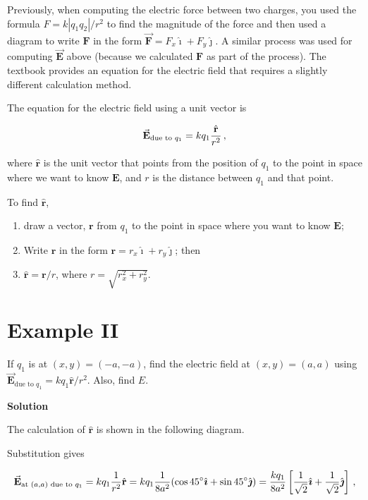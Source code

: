 \documentclass{article}
\newcommand{\ihat}[0]{\hat{\boldsymbol{\imath}}}
\newcommand{\jhat}[0]{\hat{\boldsymbol{\jmath}}}
\newcommand{\rhat}[0]{\hat{\mathbf{r}}}
\newcommand{\bfvec}[1]{\vec{\mathbf{#1}}}
\begin{document}
Previously, when computing the electric force between two charges, you used the formula $F=k{|q_1q_2|}/{r^2}$ to find the magnitude of the force and then used a diagram to write $\mathbf{F}$ in the form $\bfvec{F}=F_x\ihat + F_y\jhat$. A similar process was used for computing $\bfvec{E}$ above (because we calculated $\mathbf{F}$ as part of the process). The textbook provides an equation for the electric field that requires a slightly different calculation method.

The equation for the electric field using a unit vector is

\begin{equation}
\bfvec{E}_{\text{due to }q_1}=kq_1\frac{\rhat}{r^2}\thinspace,
\end{equation}

where $\rhat$ is the unit vector that points from the position of $q_1$ to the point in space where we want to know $\mathbf{E}$, and $r$ is the distance between $q_1$ and that point.

To find $\rhat$, 

\begin{enumerate}

  \item draw a vector, $\mathbf{r}$ from $q_1$ to the point in space where you want to know $\mathbf{E}$;

  \item Write $\mathbf{r}$ in the form $\mathbf{r}=r_x\ihat+r_y\jhat$; then

  \item $\rhat=\mathbf{r}/r$, where $r=\sqrt{r_x^2+r_y^2}$.

\end{enumerate}

\section{Example II}

If $q_1$ is at $(x,y)=(-a,-a)$, find the electric field at $(x,y)=(a,a)$ using $\bfvec{E}_{\text{due to }q_1}=kq_1{\rhat}/{r^2}$. Also, find $E$.

\textbf{Solution}

The calculation of $\rhat$ is shown in the following diagram.



Substitution gives

\begin{equation}
\bfvec{E}_{\text{at }(a,a)\text{ due to }q_1}=kq_1\frac{1}{r^2}\rhat = kq_1\frac{1}{8a^2}(\cos 45^\circ \ihat + \sin 45^\circ \jhat) =\frac{kq_1}{8a^2}\left[\frac{1}{\sqrt{2}}\ihat + \frac{1}{\sqrt{2}}\jhat\right]\thinspace,
\end{equation}
\end{document}
